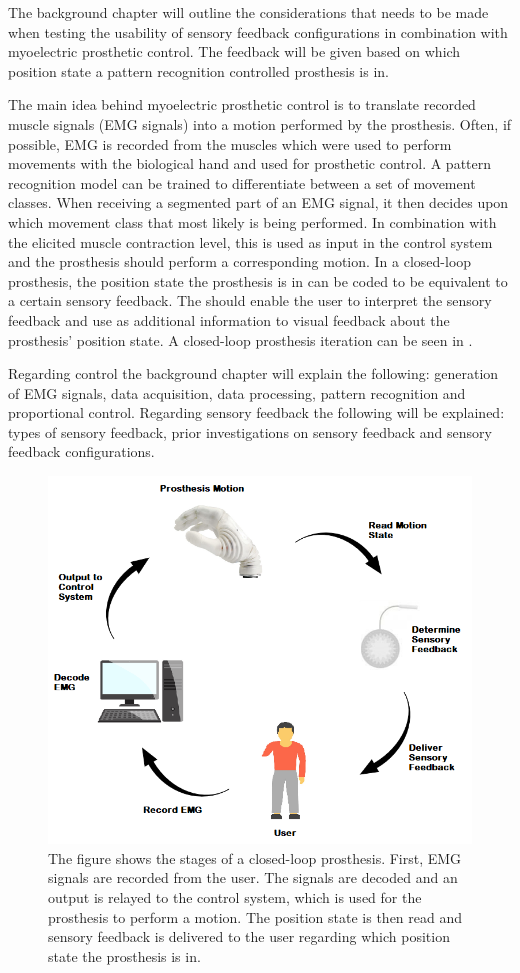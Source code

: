 The background chapter will outline the considerations that needs to be made when testing the usability of sensory feedback configurations in combination with myoelectric prosthetic control. The feedback will be given based on which position state a pattern recognition controlled prosthesis is in. 

The main idea behind myoelectric prosthetic control is to translate recorded muscle signals (EMG signals) into a motion performed by the prosthesis. Often, if possible, EMG is recorded from the muscles which were used to perform movements with the biological hand and used for prosthetic control. A pattern recognition model can be trained to differentiate between a set of movement classes. When receiving a segmented part of an EMG signal, it then decides upon which movement class that most likely is being performed. In combination with the elicited muscle contraction level, this is used as input in the control system and the prosthesis should perform a corresponding motion. \cite{Guanglin2010} In a closed-loop prosthesis, the position state the prosthesis is in can be coded to be equivalent to a certain sensory feedback. The should enable the user to interpret the sensory feedback and use as additional information to visual feedback about the prosthesis' position state. \cite{Strbac2016} A closed-loop prosthesis iteration can be seen in . 

Regarding control the background chapter will explain the following: generation of EMG signals, data acquisition, data processing, pattern recognition and proportional control. Regarding sensory feedback the following will be explained: types of sensory feedback, prior investigations on sensory feedback and sensory feedback configurations. 

\begin{figure}[H]                 
	\includegraphics[width=.65\textwidth]{figures/closed_loop_pros}  
	\caption{The figure shows the stages of a closed-loop prosthesis. First, EMG signals are recorded from the user. The signals are decoded and an output is relayed to the control system, which is used for the prosthesis to perform a motion. The position state is then read and sensory feedback is delivered to the user regarding which position state the prosthesis is in.}
	\label{fig:closed_loop_pros} 
\end{figure}